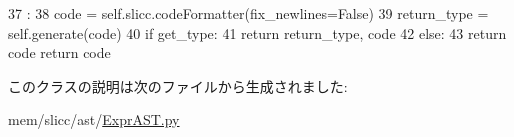 \begin{DoxyCode}
37                                     :
38         code = self.slicc.codeFormatter(fix_newlines=False)
39         return_type = self.generate(code)
40         if get_type:
41             return return_type, code
42         else:
43             return code
            return code
\end{DoxyCode}


このクラスの説明は次のファイルから生成されました:\begin{DoxyCompactItemize}
\item 
mem/slicc/ast/\hyperlink{ExprAST_8py}{ExprAST.py}\end{DoxyCompactItemize}
